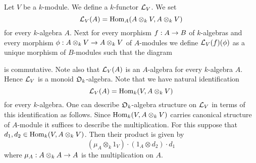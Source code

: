 \begin{example}\label{example:general_linear_monoid}
Let $V$ be a $k$-module. We define a $k$-functor ${\mathcal L}_V$. We set
$${\mathcal L}_V(A) = \mathrm{Hom}_A(A\otimes_kV,A\otimes_kV)$$
for every $k$-algebra $A$. Next for every morphism $f:A\rightarrow B$ of $k$-algebras and every morphism $\phi:A\otimes_kV\rightarrow A\otimes_kV$ of $A$-modules we define ${\mathcal L}_V(f)(\phi)$ as a unique morphism of $B$-modules such that the diagram
\begin{center}
\end{center}
is commutative. Note also that ${\mathcal L}_V(A)$ is an $A$-algebra for every $k$-algebra $A$. Hence ${\mathcal L}_V$ is a monoid ${\mathfrak O}_k$-algebra. Note that we have natural identification
$${\mathcal L}_V(A) = \mathrm{Hom}_k(V,A\otimes_kV)$$
for every $k$-algebra. One can describe ${\mathfrak O}_k$-algebra structure on ${\mathcal L}_V$ in terms of this identification as follows. Since $\mathrm{Hom}_k(V,A\otimes_kV)$ carries canonical structure of $A$-module it suffices to describe the multiplication. For this suppose that $d_1,d_2\in \mathrm{Hom}_k(V,A\otimes_kV)$. Then their product is given by
$$\left(\mu_A\otimes_k1_V\right)\cdot \left(1_A\otimes d_2\right)\cdot d_1$$
where $\mu_A:A\otimes_kA\rightarrow A$ is the multiplication on $A$.
\end{example}

